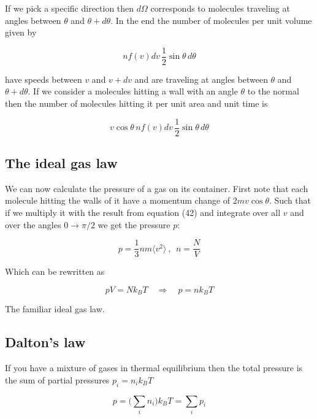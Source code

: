 \documentclass[a4paper]{article}
\begin{document}
If we pick a specific direction then $d\Omega$ corresponds to molecules traveling at angles between $\theta$ and $\theta + d\theta$. In the end the number of molecules per unit volume given by

\begin{equation}
	nf(v)dv\,\frac{1}{2}\sin\theta\,d\theta
\end{equation}

have speeds between $v$ and $v+dv$ and are traveling at angles between $\theta$ and $\theta + d\theta$. If we consider a molecules hitting a wall with an angle $\theta$ to the normal then the number of molecules hitting it per unit area and unit time is

\begin{equation}
	v\cos\theta\,nf(v)dv\,\frac{1}{2}\sin\theta\,d\theta
\end{equation}

\subsection{The ideal gas law}

We can now calculate the pressure of a gas on its container. First note that each molecule hitting the walls of it have a momentum change of $2mv\cos\theta$. Such that if we multiply it with the result from equation (42) and integrate over all $v$ and over the angles $0\rightarrow\pi/2$ we get the pressure $p$:

\begin{equation}
	p=\frac{1}{3}nm\langle v^2\rangle\ , \ \ n=\frac{N}{V}
\end{equation}

Which can be rewritten as

\begin{equation}
	pV=Nk_BT\quad\Rightarrow\quad p=nk_BT
\end{equation}

The familiar ideal gas law.

\subsection{Dalton's law}

If you have a mixture of gases in thermal equilibrium then the total pressure is the sum of partial pressures $p_i=n_ik_BT$

\begin{equation}
	p=\bigg(\sum_{i}n_i\bigg)k_BT=\sum_{i}p_i
\end{equation}
\end{document}
